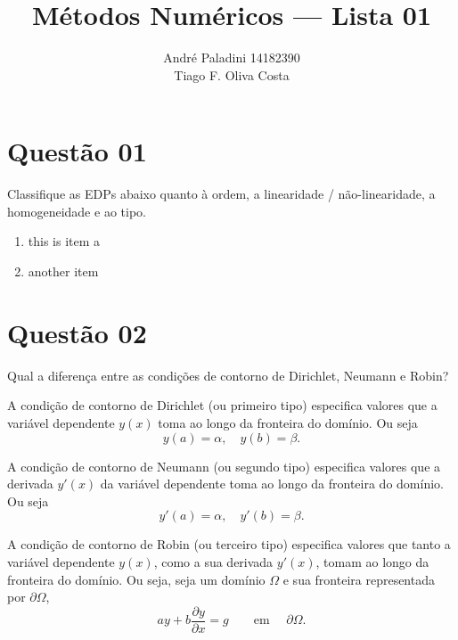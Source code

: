 \documentclass{article}
\title{Métodos Numéricos --- Lista 01}
\author{André Paladini 14182390 \\ Tiago F. Oliva Costa \quad 8004408 }
\begin{document}
\maketitle

\section{Questão 01}
Classifique as EDPs abaixo quanto à ordem, a linearidade / não-linearidade, a homogeneidade e ao tipo.

\begin{enumerate}[label=\Alph*]
\item this is item a
\item another item
\end{enumerate}

\section{Questão 02}
Qual a diferença entre as condições de contorno de Dirichlet, Neumann e Robin?

A condição de contorno de Dirichlet (ou primeiro tipo) especifica valores que a variável dependente $y(x)$ toma ao longo da fronteira do domínio. Ou seja
\[ y(a) = \alpha, \quad y(b) = \beta. \]

A condição de contorno de Neumann (ou segundo tipo) especifica valores que a derivada $y'(x)$ da variável dependente  toma ao longo da fronteira do domínio. Ou seja
\[ y'(a) = \alpha, \quad y'(b) = \beta. \]

A condição de contorno de Robin (ou terceiro tipo) especifica valores que tanto a variável dependente $y(x)$, como a sua derivada $y'(x)$, tomam ao longo da fronteira do domínio. Ou seja, seja um domínio $\Omega$ e sua fronteira representada por $\partial \Omega$,
\[ a y + b \frac{\partial y}{\partial x} =g \qquad \text{em } \quad \partial \Omega.\]
\end{document}
